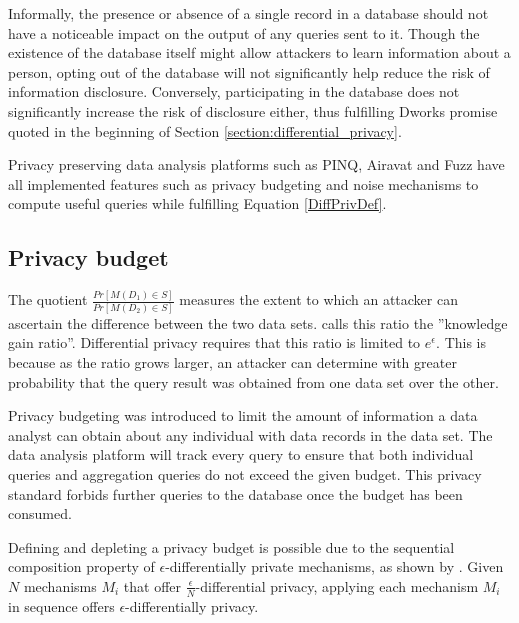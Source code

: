 Informally, the presence or absence of a single record in a database should not have a noticeable impact on the output of any queries sent to it. Though the existence of the database itself might allow attackers to learn information about a person, opting out of the database will not significantly help reduce the risk of information disclosure. Conversely, participating in the database does not significantly increase the risk of disclosure either, thus fulfilling Dworks promise quoted in the beginning of Section \ref{section:differential_privacy}.

Privacy preserving data analysis platforms such as PINQ\citep{mcsherry2009PINQ}, Airavat\citep{roy2010airavat} and Fuzz\citep{Haeberlen2011fuzz} have all implemented features such as privacy budgeting and noise mechanisms to compute useful queries while fulfilling Equation \ref{DiffPrivDef}.

\subsection{Privacy budget}
\label{section:privacy_budget}
The quotient $\frac{Pr[M(D_1)\in S]}{Pr[M(D_2)\in S]}$ measures the extent to which an attacker can ascertain the difference between the two data sets\citep{abowd2008protective}. \cite{Sarathy2011evaluating} calls this ratio the ''knowledge gain ratio''. Differential privacy requires that this ratio is limited to $e^\epsilon$. This is because as the ratio grows larger, an attacker can determine with greater probability that the query result was obtained from one data set over the other.

Privacy budgeting was introduced to limit the amount of information a data analyst can obtain about any individual with data records in the data set. The data analysis platform will track every query to ensure that both individual queries and aggregation queries do not exceed the given budget. This privacy standard forbids further queries to the database once the budget has been consumed. 

Defining and depleting a privacy budget is possible due to the sequential composition property of $\epsilon$-differentially private mechanisms, as shown by \cite{mcsherry2009PINQ}. Given $N$ mechanisms $M_i$ that offer $\frac{\epsilon}{N}$-differential privacy, applying each mechanism $M_i$ in sequence offers $\epsilon$-differentially privacy.



